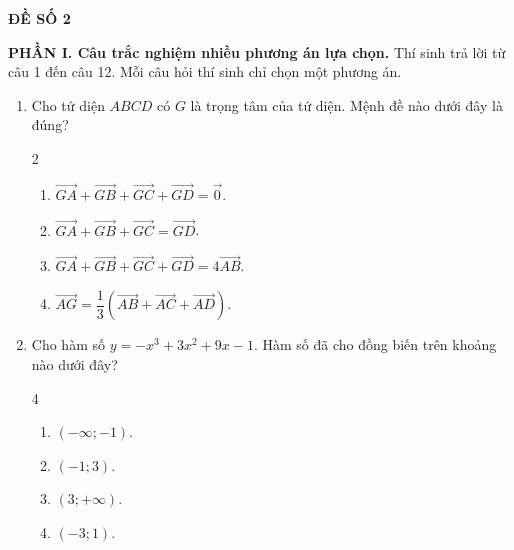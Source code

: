 \documentclass[12pt]{article}
\begin{document}
	
	
	
	
	\newpage
	\begin{center}
		{\LARGE \textbf{ĐỀ SỐ 2}}\\[4pt]
	\end{center}
	\vspace{4mm}
	
	\noindent\textbf{PHẦN I. Câu trắc nghiệm nhiều phương án lựa chọn.} Thí sinh trả lời từ câu 1 đến câu 12. Mỗi câu hỏi thí sinh chỉ chọn một phương án.
	\vspace{2mm}
	
	\begin{enumerate}[label=\textbf{Câu \arabic*.}, leftmargin=*]
		
		\item Cho tứ diện $ABCD$ có $G$ là trọng tâm của tứ diện. Mệnh đề nào dưới đây là đúng?
		\begin{multicols}{2}
			\begin{enumerate}[label=\Alph*.]
				\item $\overrightarrow{GA} + \overrightarrow{GB} + \overrightarrow{GC} + \overrightarrow{GD} = \vec{0}$.
				\item $\overrightarrow{GA} + \overrightarrow{GB} + \overrightarrow{GC} = \overrightarrow{GD}$.
				\item $\overrightarrow{GA} + \overrightarrow{GB} + \overrightarrow{GC} + \overrightarrow{GD} = 4\overrightarrow{AB}$.
				\item $\overrightarrow{AG} = \dfrac{1}{3}\left( \overrightarrow{AB} + \overrightarrow{AC} + \overrightarrow{AD} \right)$.
			\end{enumerate}
		\end{multicols}
		
		\item Cho hàm số $y = -x^3 + 3x^2 + 9x - 1$. Hàm số đã cho đồng biến trên khoảng nào dưới đây?
		\begin{multicols}{4}
			\begin{enumerate}[label=\Alph*.]
				\item $(-\infty; -1)$.
				\item $(-1; 3)$.
				\item $(3; +\infty)$.
				\item $(-3; 1)$.
			\end{enumerate}
		\end{multicols}
		

\end{enumerate}
\end{document}
